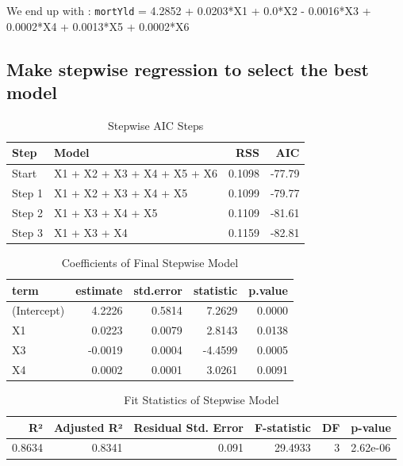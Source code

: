 \documentclass[
  11pt,
]{article}
\begin{document}
We end up with : \texttt{mortYld} = 4.2852 + 0.0203*X1 + 0.0*X2 -
0.0016*X3 + 0.0002*X4 + 0.0013*X5 + 0.0002*X6

\subsection{Make stepwise regression to select the best
model}\label{make-stepwise-regression-to-select-the-best-model}

\begin{table}[!h]
\centering
\caption{\label{tab:unnamed-chunk-12}Stepwise AIC Steps}
\centering
\fontsize{8}{10}\selectfont
\begin{tabular}[t]{llrr}
\toprule
Step & Model & RSS & AIC\\
\midrule
Start & X1 + X2 + X3 + X4 + X5 + X6 & 0.1098 & -77.79\\
Step 1 & X1 + X2 + X3 + X4 + X5 & 0.1099 & -79.77\\
Step 2 & X1 + X3 + X4 + X5 & 0.1109 & -81.61\\
Step 3 & X1 + X3 + X4 & 0.1159 & -82.81\\
\bottomrule
\end{tabular}
\end{table}

\begin{table}[!h]
\centering
\caption{\label{tab:unnamed-chunk-13}Coefficients of Final Stepwise Model}
\centering
\fontsize{8}{10}\selectfont
\begin{tabular}[t]{lrrrr}
\toprule
term & estimate & std.error & statistic & p.value\\
\midrule
(Intercept) & 4.2226 & 0.5814 & 7.2629 & 0.0000\\
X1 & 0.0223 & 0.0079 & 2.8143 & 0.0138\\
X3 & -0.0019 & 0.0004 & -4.4599 & 0.0005\\
X4 & 0.0002 & 0.0001 & 3.0261 & 0.0091\\
\bottomrule
\end{tabular}
\end{table}

\begin{table}[!h]
\centering
\caption{\label{tab:unnamed-chunk-14}Fit Statistics of Stepwise Model}
\centering
\fontsize{8}{10}\selectfont
\begin{tabular}[t]{rrrrrl}
\toprule
R² & Adjusted R² & Residual Std. Error & F-statistic & DF & p-value\\
\midrule
0.8634 & 0.8341 & 0.091 & 29.4933 & 3 & 2.62e-06\\
\bottomrule
\end{tabular}
\end{table}
\end{document}
